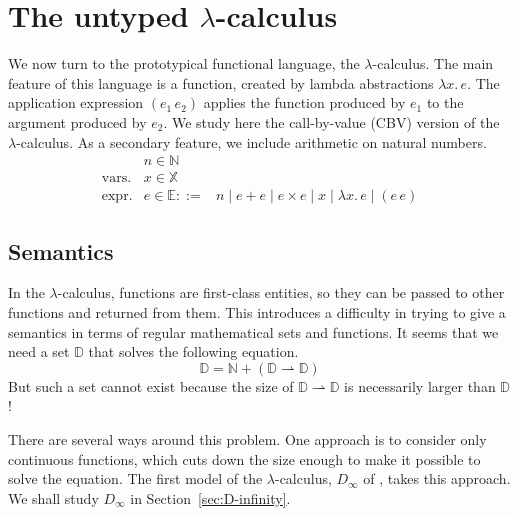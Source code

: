 \documentclass{tufte-handout}
\newcommand{\LAM}[1]{\lambda #1.\,}
\newcommand{\pto}[0]{\rightharpoonup}
\newcommand{\VAR}[0]{\mathbb{X}}
\begin{document}
\section{The untyped $\lambda$-calculus}
\label{sec:lambda}


We now turn to the prototypical functional language, the
$\lambda$-calculus. The main feature of this language is a function,
created by lambda abstractions $\LAM{x}e$. The application expression
$(e_1\,e_2)$ applies the function produced by $e_1$ to the argument
produced by $e_2$. We study here the call-by-value (CBV) version of
the $\lambda$-calculus.  As a secondary feature, we include arithmetic
on natural numbers.
\[
\begin{array}{lrl}
              & n \in \mathbb{N} \\
 \text{vars.} & x \in \VAR\\
 \text{expr.}& e \in\mathbb{E} ::=& n \mid e + e \mid e \times e \mid x \mid \LAM{x} e \mid (e \, e)
\end{array}
\]

\subsection{Semantics}

In the $\lambda$-calculus, functions are first-class entities, so they
can be passed to other functions and returned from them. This
introduces a difficulty in trying to give a semantics in terms of
regular mathematical sets and functions. It seems that we need a set
$\mathbb{D}$ that solves the following equation.
\[
   \mathbb{D} = \mathbb{N} + (\mathbb{D} \pto \mathbb{D})
\]
But such a set cannot exist because the size of $\mathbb{D} \pto
\mathbb{D}$ is necessarily larger than $\mathbb{D}$!

There are several ways around this problem. One approach is to
consider only continuous functions, which cuts down the size enough to
make it possible to solve the equation. The first model of the
$\lambda$-calculus, $D_\infty$ of \citet{Scott:1970dp}, takes this
approach. We shall study $D_\infty$ in Section~\ref{sec:D-infinity}.
\end{document}
